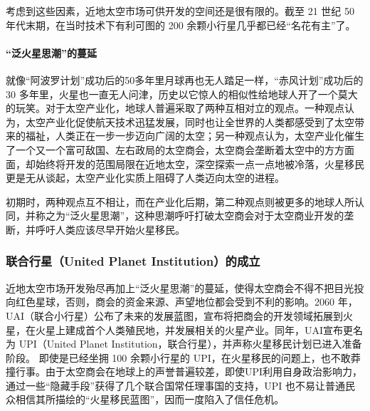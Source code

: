 \documentclass[letterpaper,10pt]{sphinxmanual}
\begin{document}
考虑到这些因素，近地太空市场可供开发的空间还是很有限的。截至 21 世纪 50 年代末期，在当时技术下有利可图的 200 余颗小行星几乎都已经“名花有主”了。
\begin{figure}[htbp]
\centering
\end{figure}


\paragraph{“泛火星思潮”的蔓延}
\label{history:index-31}\label{history:id14}
就像“阿波罗计划”成功后的50多年里月球再也无人踏足一样，“赤风计划”成功后的 30 多年里，火星也一直无人问津，历史以它惊人的相似性给地球人开了一个莫大的玩笑。对于太空产业化，地球人普遍采取了两种互相对立的观点。一种观点认为，太空产业化促使航天技术迅猛发展，同时也让全世界的人类都感受到了太空带来的福祉，人类正在一步一步迈向广阔的太空；另一种观点认为，太空产业化催生了一个又一个富可敌国、左右政局的太空商会，太空商会垄断着太空中的方方面面，却始终将开发的范围局限在近地太空，深空探索一点一点地被冷落，火星移民更是无从谈起，太空产业化实质上阻碍了人类迈向太空的进程。

初期时，两种观点互不相让，而在产业化后期，第二种观点则被更多的地球人所认同，并称之为“泛火星思潮”，这种思潮呼吁打破太空商会对于太空商业开发的垄断，并呼吁人类应该尽早开始火星移民。
\begin{figure}[htbp]
\centering
\end{figure}


\subsubsection{联合行星（United Planet Institution）的成立}
\label{history:united-planet-institution}\label{history:index-34}
近地太空市场开发殆尽再加上“泛火星思潮”的蔓延，使得太空商会不得不把目光投向红色星球，否则，商会的资金来源、声望地位都会受到不利的影响。2060 年，UAI（联合小行星）公布了未来的发展蓝图，宣布将把商会的开发领域拓展到火星，在火星上建成首个人类殖民地，并发展相关的火星产业。同年，UAI宣布更名为 UPI（United Planet Institution，联合行星），并声称火星移民计划已进入准备阶段。
即使是已经坐拥 100 余颗小行星的 UPI，在火星移民的问题上，也不敢莽撞行事。由于太空商会在地球上的声誉普遍较差，即使UPI利用自身政治影响力，通过一些“隐藏手段”获得了几个联合国常任理事国的支持，UPI 也不易让普通民众相信其所描绘的“火星移民蓝图”，因而一度陷入了信任危机。
\end{document}
